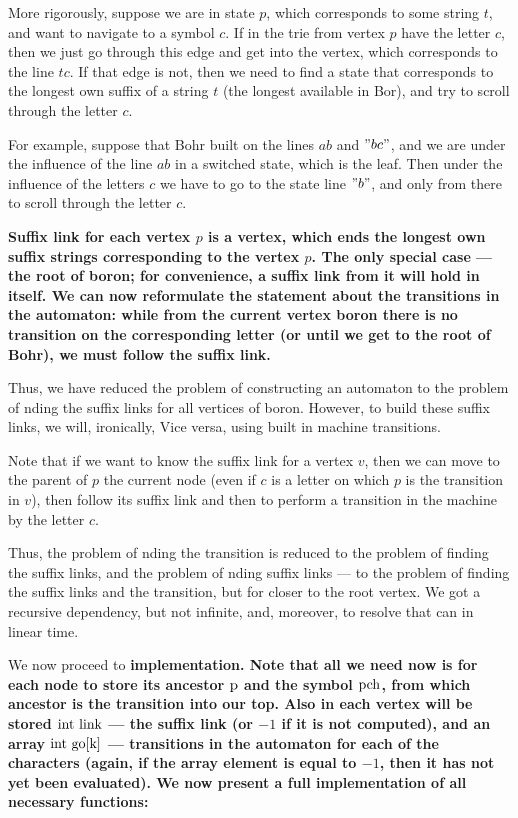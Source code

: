 More rigorously, suppose we are in state $p$, which corresponds to some string $t$, and want to navigate to a symbol $c$. If in the trie from vertex $p$ have the letter $c$, then we just go through this edge and get into the vertex, which corresponds to the line $tc$. If that edge is not, then we need to find a state that corresponds to the longest own suffix of a string $t$ (the longest available in Bor), and try to scroll through the letter $c$.

For example, suppose that Bohr built on the lines $ab$ and $"bc"$, and we are under the influence of the line $ab$ in a switched state, which is the leaf. Then under the influence of the letters $c$ we have to go to the state line $"b"$, and only from there to scroll through the letter $c$.

\bf{Suffix link} for each vertex $p$ is a vertex, which ends the longest own suffix strings corresponding to the vertex $p$. The only special case --- the root of boron; for convenience, a suffix link from it will hold in itself. We can now reformulate the statement about the transitions in the automaton: while from the current vertex boron there is no transition on the corresponding letter (or until we get to the root of Bohr), we must follow the suffix link.

Thus, we have reduced the problem of constructing an automaton to the problem of nding the suffix links for all vertices of boron. However, to build these suffix links, we will, ironically, Vice versa, using built in machine transitions.

Note that if we want to know the suffix link for a vertex $v$, then we can move to the parent of $p$ the current node (even if $c$ is a letter on which $p$ is the transition in $v$), then follow its suffix link and then to perform a transition in the machine by the letter $c$.

Thus, the problem of nding the transition is reduced to the problem of finding the suffix links, and the problem of nding suffix links --- to the problem of finding the suffix links and the transition, but for closer to the root vertex. We got a recursive dependency, but not infinite, and, moreover, to resolve that can in linear time.

We now proceed to \bf{implementation}. Note that all we need now is for each node to store its ancestor $\rm p$ and the symbol $\rm pch$, from which ancestor is the transition into our top. Also in each vertex will be stored $\rm int~link$ --- the suffix link (or $-1$ if it is not computed), and an array $\rm int~go[k]$ --- transitions in the automaton for each of the characters (again, if the array element is equal to $-1$, then it has not yet been evaluated). We now present a full implementation of all necessary functions:

